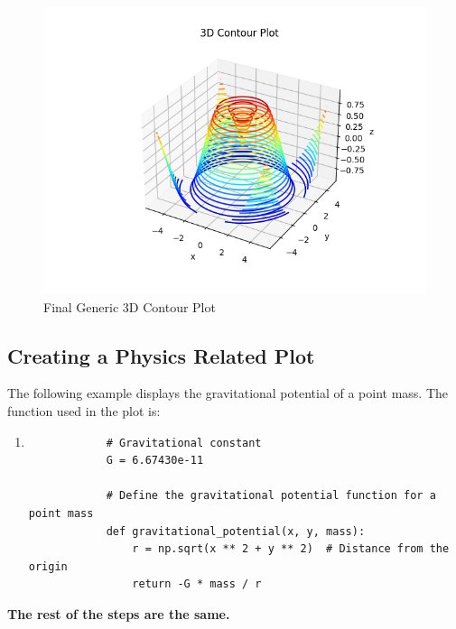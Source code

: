 \documentclass[
11pt, %
a4paper, %
oneside, %
headinclude,footinclude, %
BCOR5mm, %
]{scrartcl}
\begin{document}
	\begin{figure}[H]
		\centering %
		\includegraphics[width=0.4\columnwidth]{Figures/Figure3.png} 
		\caption[Final Generic 3D Contour Plot]{Final Generic 3D Contour Plot} %
		\label{fig:gallery} 
	\end{figure}
	
\subsection{Creating a Physics Related Plot}
	
	The following example displays the gravitational potential of a point mass.
	\newline
	\newline
	The function used in the plot is:
	\begin{enumerate}
		\item[] \begin{verbatim}
			# Gravitational constant
			G = 6.67430e-11
			
			# Define the gravitational potential function for a point mass
			def gravitational_potential(x, y, mass):
			    r = np.sqrt(x ** 2 + y ** 2)  # Distance from the origin
			    return -G * mass / r
		\end{verbatim}
	\end{enumerate}
	
	\textbf{The rest of the steps are the same.}
	
\end{document}

